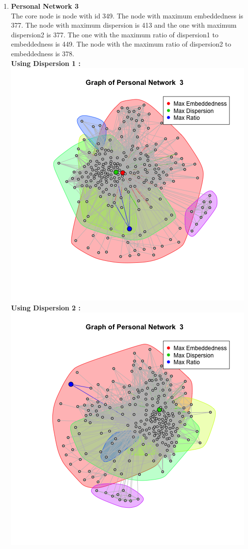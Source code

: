 \documentclass{article}
\begin{document}
\begin{enumerate}
 \item \textbf{Personal Network 3}\\
 The core node is node with id 349. The node with maximum embeddedness is 377.
 The node with maximum dispersion is 413 and the one with maximum dispersion2 is 377.
 The one with the maximum ratio of dispersion1 to embeddedness is 449.
 The node with the maximum ratio of dispersion2 to embeddedness  is 378.\\
 \textbf{Using Dispersion 1 :}\\
\includegraphics[scale=0.4]{d13} \\
 \textbf{Using Dispersion 2 :}\\
 \includegraphics[scale=0.4]{d16} \\
\end{enumerate}
\end{document}
